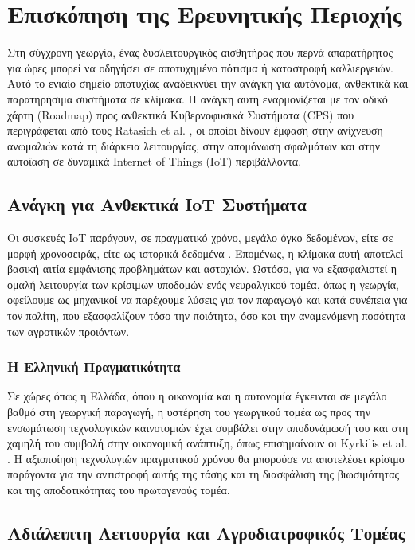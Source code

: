 \chapter{Επισκόπηση της Ερευνητικής Περιοχής}

Στη σύγχρονη γεωργία, ένας δυσλειτουργικός αισθητήρας που περνά απαρατήρητος για ώρες μπορεί να οδηγήσει σε αποτυχημένο πότισμα ή καταστροφή καλλιεργειών. Αυτό το ενιαίο σημείο αποτυχίας αναδεικνύει την ανάγκη για αυτόνομα, ανθεκτικά και παρατηρήσιμα συστήματα σε κλίμακα. Η ανάγκη αυτή εναρμονίζεται με τον οδικό χάρτη (Roadmap) προς ανθεκτικά Κυβερνοφυσικά Συστήματα (CPS) που περιγράφεται από τους Ratasich et al. \cite{iotcps}, οι οποίοι δίνουν έμφαση στην ανίχνευση ανωμαλιών κατά τη διάρκεια λειτουργίας, στην απομόνωση σφαλμάτων και στην αυτοΐαση σε δυναμικά Internet of Things (IoT) περιβάλλοντα.

\section{Ανάγκη για Ανθεκτικά IoT Συστήματα}

Οι συσκευές IoT παράγουν, σε πραγματικό χρόνο, μεγάλο όγκο δεδομένων, είτε σε μορφή χρονοσειράς, είτε ως ιστορικά δεδομένα \cite{rtiotevents}. Επομένως, η κλίμακα αυτή αποτελεί βασική αιτία εμφάνισης προβλημάτων και αστοχιών. Ωστόσο, για να εξασφαλιστεί η ομαλή λειτουργία των κρίσιμων υποδομών ενός νευραλγικού τομέα, όπως η γεωργία, οφείλουμε ως μηχανικοί να παρέχουμε λύσεις για τον παραγωγό και κατά συνέπεια για τον πολίτη, που εξασφαλίζουν τόσο την ποιότητα, όσο και την αναμενόμενη ποσότητα των αγροτικών προιόντων.

\subsection{Η Ελληνική Πραγματικότητα}

Σε χώρες όπως η Ελλάδα, όπου η οικονομία και η αυτονομία έγκεινται σε μεγάλο βαθμό στη γεωργική παραγωγή, η υστέρηση του γεωργικού τομέα ως προς την ενσωμάτωση τεχνολογικών καινοτομιών έχει συμβάλει στην αποδυνάμωσή του και στη χαμηλή του συμβολή στην οικονομική ανάπτυξη, όπως επισημαίνουν οι Kyrkilis et al. \cite{gragriculture}. Η αξιοποίηση τεχνολογιών πραγματικού χρόνου θα μπορούσε να αποτελέσει κρίσιμο παράγοντα για την αντιστροφή αυτής της τάσης και τη διασφάλιση της βιωσιμότητας και της αποδοτικότητας του πρωτογενούς τομέα.

\section{Αδιάλειπτη Λειτουργία και Αγροδιατροφικός Τομέας}

